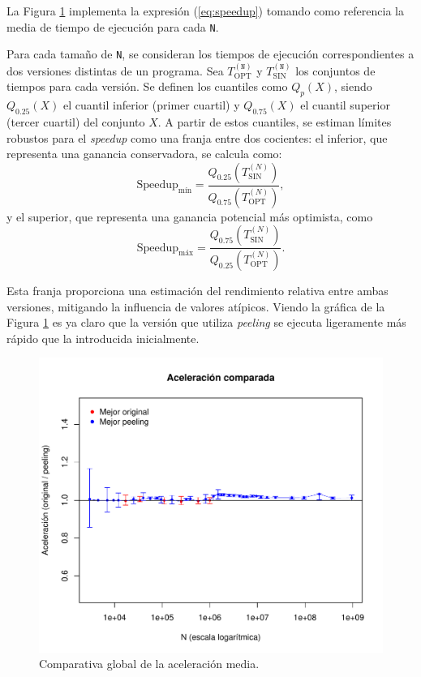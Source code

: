\documentclass[11pt,a4paper,twoside]{article}
\theoremstyle{definition}
\begin{document}
	La Figura \ref{graf:speedup} implementa la expresión (\ref{eq:speedup}) tomando como referencia la media de tiempo de ejecución para cada \texttt{N}.
	
	Para cada tamaño de \texttt{N}, se consideran los tiempos de ejecución correspondientes a dos versiones distintas de un programa. Sea \( T_{\mathrm{OPT}}^{(\texttt{N})} \) y \( T_{\mathrm{SIN}}^{(\texttt{N})} \) los conjuntos de tiempos para cada versión. Se definen los cuantiles como \( Q_p(X) \), siendo \( Q_{0.25}(X) \) el cuantil inferior (primer cuartil) y \( Q_{0.75}(X) \) el cuantil superior (tercer cuartil) del conjunto \( X \). A partir de estos cuantiles, se estiman límites robustos para el \textit{speedup} como una franja entre dos cocientes: el inferior, que representa una ganancia conservadora, se calcula como:
	\begin{equation}\label{q1}
		\text{Speedup}_{\text{mín}} = \frac{Q_{0.25}\left(T_{\mathrm{SIN}}^{(N)}\right)}{Q_{0.75}\left(T_{\mathrm{OPT}}^{(N)}\right)},
	\end{equation}
	y el superior, que representa una ganancia potencial más optimista, como
	\begin{equation} \label{q2}
		\text{Speedup}_{\text{máx}} = \frac{Q_{0.75}\left(T_{\mathrm{SIN}}^{(N)}\right)}{Q_{0.25}\left(T_{\mathrm{OPT}}^{(N)}\right)}.
	\end{equation}
	
	Esta franja proporciona una estimación del rendimiento relativa entre ambas versiones, mitigando la influencia de valores atípicos.
	Viendo la gráfica de la Figura \ref{graf:speedup} es ya claro que la versión que utiliza \textit{peeling} se ejecuta ligeramente más rápido que la introducida inicialmente.
	
	\begin{figure} [H] \centering
		\includegraphics[width=.8\textwidth]{../graficas/DIA_speedup.pdf}
		\caption{Comparativa global de la aceleración media.}
		\label{graf:speedup}
	\end{figure}
\end{document}
